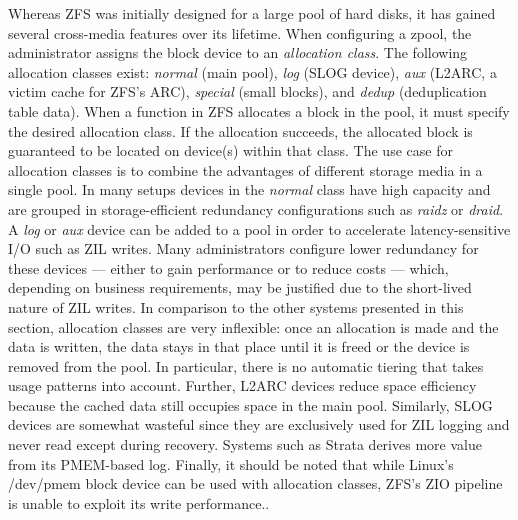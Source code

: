 \documentclass[12pt,a4paper,twoside]{book}
\begin{document}
Whereas ZFS was initially designed for a large pool of hard disks, it has gained several cross-media features over its lifetime.
When configuring a zpool, the administrator assigns the block device to an \textit{allocation class}.
The following allocation classes exist: \textit{normal} (main pool), \textit{log} (SLOG device), \textit{aux} (L2ARC, a victim cache for ZFS's ARC), \textit{special} (small blocks), and \textit{dedup} (deduplication table data).
When a function in ZFS allocates a block in the pool, it must specify the desired allocation class.
If the allocation succeeds, the allocated block is guaranteed to be located on device(s) within that class.
The use case for allocation classes is to combine the advantages of different storage media in a single pool.
In many setups devices in the \textit{normal} class have high capacity and are grouped in storage-efficient redundancy configurations such as \textit{raidz} or \textit{draid}.
A \textit{log} or \textit{aux} device can be added to a pool in order to accelerate latency-sensitive I/O such as ZIL writes.
Many administrators configure lower redundancy for these devices --- either to gain performance or to reduce costs --- which, depending on business requirements, may be justified due to the short-lived nature of ZIL writes.
In comparison to the other systems presented in this section, allocation classes are very inflexible:
once an allocation is made and the data is written, the data stays in that place until it is freed or the device is removed from the pool.
In particular, there is no automatic tiering that takes usage patterns into account.
Further, L2ARC devices reduce space efficiency because the cached data still occupies space in the main pool.
Similarly, SLOG devices are somewhat wasteful since they are exclusively used for ZIL logging and never read except during recovery.
Systems such as Strata derives more value from its PMEM-based log.
Finally, it should be noted that while Linux's /dev/pmem block device can be used with allocation classes, ZFS's ZIO pipeline is unable to exploit its write performance..
\end{document}

